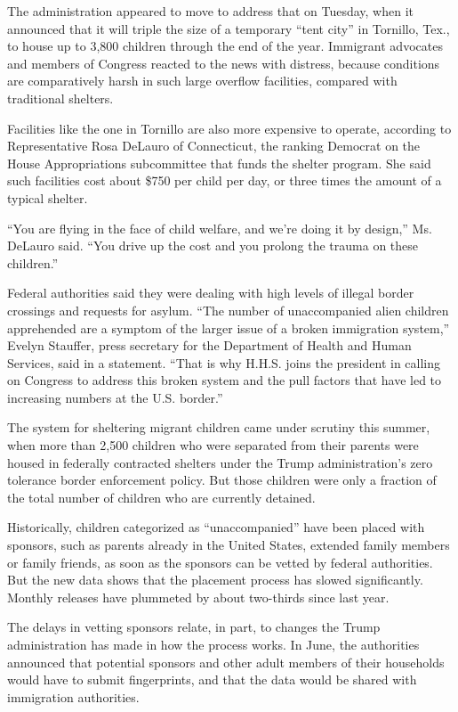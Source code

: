 The administration appeared to move to address that on Tuesday, when it
announced that it will triple the size of a temporary ``tent city'' in
Tornillo, Tex., to house up to 3,800 children through the end of the
year. Immigrant advocates and members of Congress reacted to the news
with distress, because conditions are comparatively harsh in such large
overflow facilities, compared with traditional shelters.

Facilities like the one in Tornillo are also more expensive to operate,
according to Representative Rosa DeLauro of Connecticut, the ranking
Democrat on the House Appropriations subcommittee that funds the shelter
program. She said such facilities cost about \$750 per child per day, or
three times the amount of a typical shelter.

``You are flying in the face of child welfare, and we're doing it by
design,'' Ms. DeLauro said. ``You drive up the cost and you prolong the
trauma on these children.''

Federal authorities said they were dealing with high levels of illegal
border crossings and requests for asylum. ``The number of unaccompanied
alien children apprehended are a symptom of the larger issue of a broken
immigration system,'' Evelyn Stauffer, press secretary for the
Department of Health and Human Services, said in a statement. ``That is
why H.H.S. joins the president in calling on Congress to address this
broken system and the pull factors that have led to increasing numbers
at the U.S. border.''

The system for sheltering migrant children came under scrutiny this
summer, when more than 2,500 children who were separated from their
parents were housed in federally contracted shelters under the Trump
administration's zero tolerance border enforcement policy. But those
children were only a fraction of the total number of children who are
currently detained.

Historically, children categorized as ``unaccompanied'' have been placed
with sponsors, such as parents already in the United States, extended
family members or family friends, as soon as the sponsors can be vetted
by federal authorities. But the new data shows that the placement
process has slowed significantly. Monthly releases have plummeted by
about two-thirds since last year.

The delays in vetting sponsors relate, in part, to changes the Trump
administration has made in how the process works. In June, the
authorities announced that potential sponsors and other adult members of
their households would have to submit fingerprints, and that the data
would be shared with immigration authorities.

